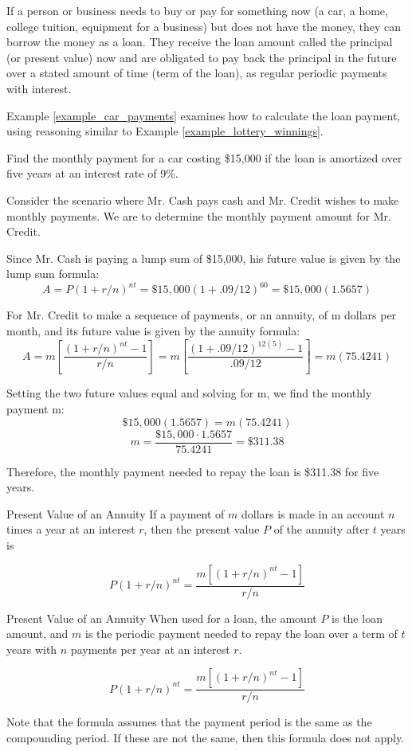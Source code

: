 If a person or business needs to buy or pay for something now (a car, a home, college tuition, equipment for a business) but does not have the money, they can borrow the money as a loan. They receive the loan amount called the principal (or present value) now and are obligated to pay back the principal in the future over a stated amount of time (term of the loan), as regular periodic payments with interest.

Example \ref{example_car_payments} examines how to calculate the loan payment, using reasoning similar to Example \ref{example_lottery_winnings}.

\begin{example}\label{example_car_payments}
    Find the monthly payment for a car costing \$15,000 if the loan is amortized over five years at an interest rate of 9\%.
\end{example}

\begin{solution}
    Consider the scenario where Mr. Cash pays cash and Mr. Credit wishes to make monthly payments. We are to determine the monthly payment amount for Mr. Credit.

    Since Mr. Cash is paying a lump sum of \$15,000, his future value is given by the lump sum formula:
    \[ A = P(1 + r/n)^{nt} = \$15,000(1 + .09/12)^{60} = \$15,000(1.5657)\]

    For Mr. Credit to make a sequence of payments, or an annuity, of m dollars per month, and its future value is given by the annuity formula:
    \[ A = m\left[\frac{(1 + r/n)^{nt} - 1}{r/n}\right] = m\left[\frac{(1 + .09/12)^{12(5)} - 1}{.09/12}\right] = m(75.4241)\]

    Setting the two future values equal and solving for m, we find the monthly payment m:
    \[ \$15,000(1.5657) = m(75.4241) \]
    \[ m = \frac{\$15,000 \cdot 1.5657}{75.4241} = \$311.38 \]

    Therefore, the monthly payment needed to repay the loan is \$311.38 for five years.
\end{solution}


\begin{summarybox}{Present Value of an Annuity}
    If a payment of \( m \) dollars is made in an account \( n \) times a year at an interest \( r \), then the present value \( P \) of the annuity after \( t \) years is

    \[
        P(1 + r/n)^{nt} = \frac{m[(1 + r/n)^{nt} - 1]}{r/n}
    \]
\end{summarybox}
\begin{summarybox}{Present Value of an Annuity}
    When used for a loan, the amount \( P \) is the loan amount, and \( m \) is the periodic payment needed to repay the loan over a term of \( t \) years with \( n \) payments per year at an interest \( r \).

    \[
        P(1 + r/n)^{nt} = \frac{m[(1 + r/n)^{nt} - 1]}{r/n}
    \]

\end{summarybox}

Note that the formula assumes that the payment period is the same as the compounding period. If these are not the same, then this formula does not apply.

